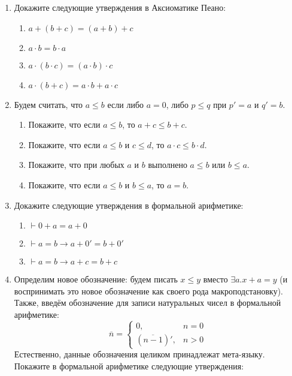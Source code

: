 \documentclass[10pt,a4paper,oneside]{article}
\begin{document}
\begin{enumerate}
\item Докажите следующие утверждения в Аксиоматике Пеано:
\begin{enumerate}
\item $a + (b + c) = (a+b) + c$
\item $a \cdot b = b \cdot a$
\item $a \cdot (b \cdot c) = (a \cdot b) \cdot c$
\item $a \cdot (b + c) = a \cdot b + a \cdot c$
\end{enumerate}
                                                 
\item Будем считать, что $a \le b$ если либо $a=0$, либо $p\le q$ при $p' = a$ и $q' = b$.

\begin{enumerate}
\item Покажите, что если $a \le b$, то $a + c \le b + c$.
\item Покажите, что если $a \le b$ и $c \le d$, то $a \cdot c \le b \cdot d$.
\item Покажите, что при любых $a$ и $b$ выполнено $a \le b$ или $b \le a$.
\item Покажите, что если $a \le b$ и $b \le a$, то $a = b$.
\end{enumerate}

\item Докажите следующие утверждения в формальной арифметике:

\begin{enumerate}
\item $\vdash 0 + a = a + 0$
\item $\vdash a = b \rightarrow a + 0' = b + 0'$
\item $\vdash a = b \rightarrow a + c = b + c$
\end{enumerate}

\item Определим новое обозначение: будем писать $x \le y$ вместо $\exists a.x + a = y$
(и воспринимать это новое обозначение как своего рода макроподстановку).
Также, введём обозначение для записи натуральных чисел в формальной арифметике:
$$\overline{n} = \left\{\begin{array}{ll}0,& n=0 \\ (\overline{n-1})',& n > 0\end{array}\right.$$
Естественно, данные обозначения целиком принадлежат мета-языку.
Покажите в формальной арифметике следующие утверждения:


\end{enumerate}
\end{document}
